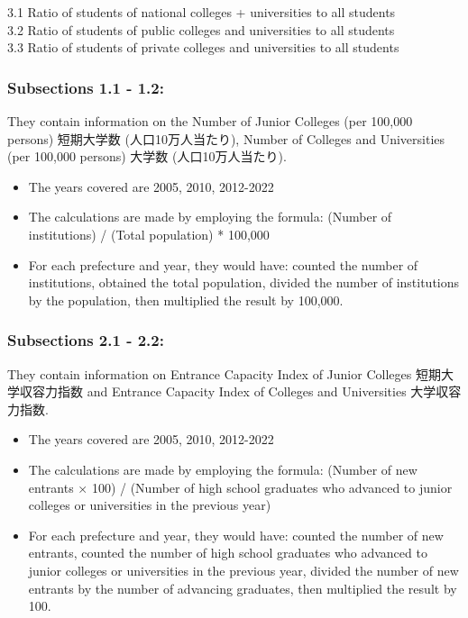 \documentclass[
  12pt,
  letterpaper,
  DIV=11,
  numbers=noendperiod]{scrartcl}
\begin{document}
3.1 Ratio of students of national colleges + universities to all
students\\
3.2 Ratio of students of public colleges and universities to all
students\\
3.3 Ratio of students of private colleges and universities to all
students

\hypertarget{subsections-1.1---1.2-1}{%
\subsubsection{Subsections 1.1 - 1.2:}\label{subsections-1.1---1.2-1}}

They contain information on the Number of Junior Colleges (per 100,000
persons) 短期大学数 (人口10万人当たり), Number of Colleges and
Universities (per 100,000 persons) 大学数 (人口10万人当たり).

\begin{itemize}
\item
  The years covered are 2005, 2010, 2012-2022
\item
  The calculations are made by employing the formula: (Number of
  institutions) / (Total population) * 100,000
\item
  For each prefecture and year, they would have: counted the number of
  institutions, obtained the total population, divided the number of
  institutions by the population, then multiplied the result by 100,000.
\end{itemize}

\hypertarget{subsections-2.1---2.2}{%
\subsubsection{Subsections 2.1 - 2.2:}\label{subsections-2.1---2.2}}

They contain information on Entrance Capacity Index of Junior Colleges
短期大学収容力指数 and Entrance Capacity Index of Colleges and
Universities 大学収容力指数.

\begin{itemize}
\item
  The years covered are 2005, 2010, 2012-2022
\item
  The calculations are made by employing the formula: (Number of new
  entrants × 100) / (Number of high school graduates who advanced to
  junior colleges or universities in the previous year)
\item
  For each prefecture and year, they would have: counted the number of
  new entrants, counted the number of high school graduates who advanced
  to junior colleges or universities in the previous year, divided the
  number of new entrants by the number of advancing graduates, then
  multiplied the result by 100.
\end{itemize}
\end{document}
